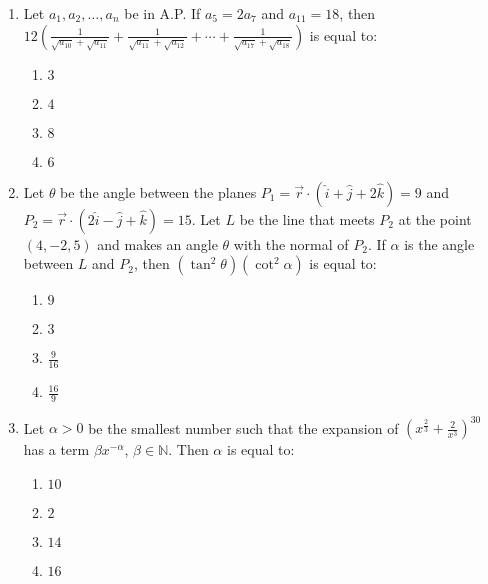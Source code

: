 \documentclass[journal]{IEEEtran}
\newcommand{\brak}[1]{\left( #1 \right)}
\newcommand{\gt}{>}
\begin{document}
\begin{enumerate}
    \item Let $a_{1}, a_{2},\ldots,a_{n}$ be in A.P. If $a_{5}=2a_{7}$ and $a_{11}=18$, then
    $
    12\left(\frac{1}{\sqrt{a_{10}}+\sqrt{a_{11}}}+\frac{1}{\sqrt{a_{11}}+\sqrt{a_{12}}}+\cdots+\frac{1}{\sqrt{a_{17}}+\sqrt{a_{18}}}\right)
    $
    is equal to:
    
        \begin{multicols}{4}
        \begin{enumerate}
        \item $3$
        \item $4$
        \item $8$
        \item $6$
        \end{enumerate}
        \end{multicols}
   
    \item Let $\theta$ be the angle between the planes $P_{1}=\vec{r}\cdot\brak{\hat{i}+\hat{j}+2\hat{k}}=9$ and $P_{2}=\vec{r}\cdot\brak{2\hat{i}-\hat{j}+\hat{k}}=15$. Let $L$ be the line that meets $P_{2}$ at the point $\brak{4,-2, 5}$ and makes an angle $\theta$ with the normal of $P_{2}$. If $\alpha$ is the angle between $L$ and $P_{2}$, then $\brak{\tan^{2}\theta}\brak{\cot^{2}\alpha}$ is equal to:

        \begin{multicols}{4}
        \begin{enumerate}
        \item $9$
        \item $3$
        \item $\frac{9}{16}$
        \item $\frac{16}{9}$
        \end{enumerate}
        \end{multicols}

    \item Let $\alpha \gt 0$ be the smallest number such that the expansion of $\brak{x^{\frac{2}{3}}+\frac{2}{x^{3}}}^{30}$ has a term $\beta x^{-\alpha}$, $\beta\in\mathbb{N}$. Then $\alpha$ is equal to:

        \begin{multicols}{4}
        \begin{enumerate}
        \item $10$
        \item $2$
        \item $14$
        \item $16$
        \end{enumerate}
        \end{multicols}


\end{enumerate}
\end{document}
